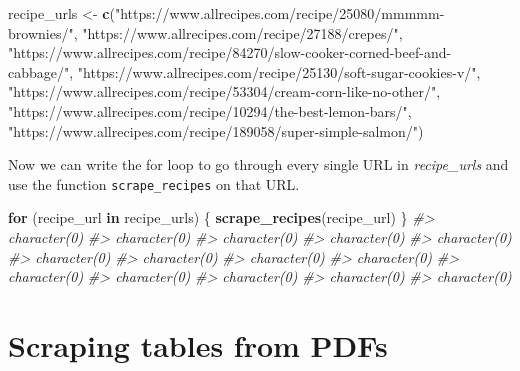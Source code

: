 \documentclass[
  12pt,
]{book}
\newenvironment{Shaded}{\begin{snugshade}}{\end{snugshade}}
\newcommand{\CommentTok}[1]{\textcolor[rgb]{0.37,0.37,0.37}{\textit{#1}}}
\newcommand{\ControlFlowTok}[1]{\textcolor[rgb]{0.27,0.27,0.27}{\textbf{#1}}}
\newcommand{\KeywordTok}[1]{\textcolor[rgb]{0.27,0.27,0.27}{\textbf{#1}}}
\newcommand{\NormalTok}[1]{#1}
\newcommand{\StringTok}[1]{\textcolor[rgb]{0.5,0.5,0.5}{#1}}
\begin{document}
\begin{Shaded}
\begin{Highlighting}[]
\NormalTok{recipe\_urls \textless{}{-}}\StringTok{ }\KeywordTok{c}\NormalTok{(}\StringTok{"https://www.allrecipes.com/recipe/25080/mmmmm{-}brownies/"}\NormalTok{,}
                 \StringTok{"https://www.allrecipes.com/recipe/27188/crepes/"}\NormalTok{,}
                 \StringTok{"https://www.allrecipes.com/recipe/84270/slow{-}cooker{-}corned{-}beef{-}and{-}cabbage/"}\NormalTok{,}
                 \StringTok{"https://www.allrecipes.com/recipe/25130/soft{-}sugar{-}cookies{-}v/"}\NormalTok{,}
                 \StringTok{"https://www.allrecipes.com/recipe/53304/cream{-}corn{-}like{-}no{-}other/"}\NormalTok{,}
                 \StringTok{"https://www.allrecipes.com/recipe/10294/the{-}best{-}lemon{-}bars/"}\NormalTok{,}
                 \StringTok{"https://www.allrecipes.com/recipe/189058/super{-}simple{-}salmon/"}\NormalTok{)}
\end{Highlighting}
\end{Shaded}

Now we can write the for loop to go through every single URL in \emph{recipe\_urls} and use the function \texttt{scrape\_recipes} on that URL.

\begin{Shaded}
\begin{Highlighting}[]
\ControlFlowTok{for}\NormalTok{ (recipe\_url }\ControlFlowTok{in}\NormalTok{ recipe\_urls) \{}
  \KeywordTok{scrape\_recipes}\NormalTok{(recipe\_url)}
\NormalTok{\}}
\CommentTok{\#\textgreater{} character(0)}
\CommentTok{\#\textgreater{} character(0)}
\CommentTok{\#\textgreater{} character(0)}
\CommentTok{\#\textgreater{} character(0)}
\CommentTok{\#\textgreater{} character(0)}
\CommentTok{\#\textgreater{} character(0)}
\CommentTok{\#\textgreater{} character(0)}
\CommentTok{\#\textgreater{} character(0)}
\CommentTok{\#\textgreater{} character(0)}
\CommentTok{\#\textgreater{} character(0)}
\CommentTok{\#\textgreater{} character(0)}
\CommentTok{\#\textgreater{} character(0)}
\CommentTok{\#\textgreater{} character(0)}
\CommentTok{\#\textgreater{} character(0)}
\end{Highlighting}
\end{Shaded}

\hypertarget{scrape-table}{%
\chapter{Scraping tables from PDFs}\label{scrape-table}}
\end{document}
